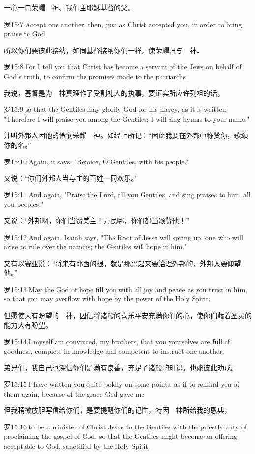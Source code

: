 \documentclass[a4paper,11pt,onecolumn,twoside]{ctexart}
\begin{document}
\begin{multicols}{2}
 一心一口荣耀　神、我们主耶稣基督的父。


 罗15:7
 Accept one another, then, just as Christ accepted you, in order to bring praise to God.

 所以你们要彼此接纳，如同基督接纳你们一样，使荣耀归与　神。


 罗15:8
 For I tell you that Christ has become a servant of the Jews on behalf of God's truth, to confirm the promises made to the patriarchs

 我说，基督是为　神真理作了受割礼人的执事，要证实所应许列祖的话，


 罗15:9
 so that the Gentiles may glorify God for his mercy, as it is written: "Therefore I will praise you among the Gentiles; I will sing hymns to your name."

 并叫外邦人因他的怜悯荣耀　神。如经上所记：“因此我要在外邦中称赞你，歌颂你的名。”


 罗15:10
 Again, it says, "Rejoice, O Gentiles, with his people."

 又说：“你们外邦人当与主的百姓一同欢乐。”


 罗15:11
 And again, "Praise the Lord, all you Gentiles, and sing praises to him, all you peoples."

 又说：“外邦啊，你们当赞美主！万民哪，你们都当颂赞他！”


 罗15:12
 And again, Isaiah says, "The Root of Jesse will spring up, one who will arise to rule over the nations; the Gentiles will hope in him."

 又有以赛亚说：“将来有耶西的根，就是那兴起来要治理外邦的，外邦人要仰望他。”


 罗15:13
 May the God of hope fill you with all joy and peace as you trust in him, so that you may overflow with hope by the power of the Holy Spirit.

 但愿使人有盼望的　神，因信将诸般的喜乐平安充满你们的心，使你们藉着圣灵的能力大有盼望。


 罗15:14
 I myself am convinced, my brothers, that you yourselves are full of goodness, complete in knowledge and competent to instruct one another.

 弟兄们，我自己也深信你们是满有良善，充足了诸般的知识，也能彼此劝戒。


 罗15:15
 I have written you quite boldly on some points, as if to remind you of them again, because of the grace God gave me

 但我稍微放胆写信给你们，是要提醒你们的记性，特因　神所给我的恩典，


 罗15:16
 to be a minister of Christ Jesus to the Gentiles with the priestly duty of proclaiming the gospel of God, so that the Gentiles might become an offering acceptable to God, sanctified by the Holy Spirit.


\end{multicols}
\end{document}
